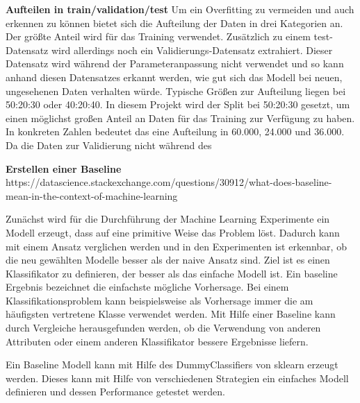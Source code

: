 


\textbf{Aufteilen in train/validation/test}
Um ein Overfitting zu vermeiden und auch erkennen zu können bietet sich die Aufteilung der Daten in drei Kategorien an.
Der größte Anteil wird für das Training verwendet.
Zusätzlich zu einem test-Datensatz wird allerdings noch ein Validierungs-Datensatz extrahiert.
Dieser Datensatz wird während der Parameteranpassung nicht verwendet und so kann anhand diesen Datensatzes erkannt werden, wie gut sich das Modell bei neuen, ungesehenen Daten verhalten würde. 
Typische Größen zur Aufteilung liegen bei 50:20:30 oder 40:20:40. 
In diesem Projekt wird der Split bei 50:20:30 gesetzt, um einen möglichst großen Anteil an Daten für das Training zur Verfügung zu haben. 
\cite{Fundamentals of ML Kapitel 8}
In konkreten Zahlen bedeutet das eine Aufteilung in 60.000, 24.000 und 36.000. 
Da die Daten zur Validierung nicht während des 


\textbf{Erstellen einer Baseline}
https://datascience.stackexchange.com/questions/30912/what-does-baseline-mean-in-the-context-of-machine-learning

Zunächst wird für die Durchführung der Machine Learning Experimente ein Modell erzeugt, dass auf eine primitive Weise das Problem löst.
Dadurch kann mit einem Ansatz verglichen werden und in den Experimenten ist erkennbar, ob die neu gewählten Modelle besser als der naive Ansatz sind. %
Ziel ist es einen Klassifikator zu definieren, der besser als das einfache Modell ist. 
Ein baseline Ergebnis bezeichnet die einfachste mögliche Vorhersage. 
Bei einem Klassifikationsproblem kann beispielsweise als Vorhersage immer die am häufigsten vertretene Klasse verwendet werden. \cite{brownlee2014}
Mit Hilfe einer Baseline kann durch Vergleiche herausgefunden werden, ob die Verwendung von anderen Attributen oder einem anderen Klassifikator bessere Ergebnisse liefern. \cite{brownlee2014}

Ein Baseline Modell kann mit Hilfe des DummyClassifiers von sklearn erzeugt werden. 
Dieses kann mit Hilfe von verschiedenen Strategien ein einfaches Modell definieren und dessen Performance getestet werden. %

